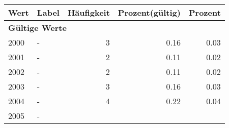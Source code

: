      \begin{longtable}{lXrrr}
     \toprule
     \textbf{Wert} & \textbf{Label} & \textbf{Häufigkeit} & \textbf{Prozent(gültig)} & \textbf{Prozent} \\
     \endhead
     \midrule
     \multicolumn{5}{l}{\textbf{Gültige Werte}}\\

     2000 &
     \multicolumn{1}{X}{ -  } &


       \num{3} &
       \num[round-mode=places,round-precision=2]{0,16} &
         \num[round-mode=places,round-precision=2]{0,03} \\

     2001 &
     \multicolumn{1}{X}{ -  } &


       \num{2} &
       \num[round-mode=places,round-precision=2]{0,11} &
         \num[round-mode=places,round-precision=2]{0,02} \\

     2002 &
     \multicolumn{1}{X}{ -  } &


       \num{2} &
       \num[round-mode=places,round-precision=2]{0,11} &
         \num[round-mode=places,round-precision=2]{0,02} \\

     2003 &
     \multicolumn{1}{X}{ -  } &


       \num{3} &
       \num[round-mode=places,round-precision=2]{0,16} &
         \num[round-mode=places,round-precision=2]{0,03} \\

     2004 &
     \multicolumn{1}{X}{ -  } &


       \num{4} &
       \num[round-mode=places,round-precision=2]{0,22} &
         \num[round-mode=places,round-precision=2]{0,04} \\

     2005 &
     \multicolumn{1}{X}{ -  } &



\end{longtable}
